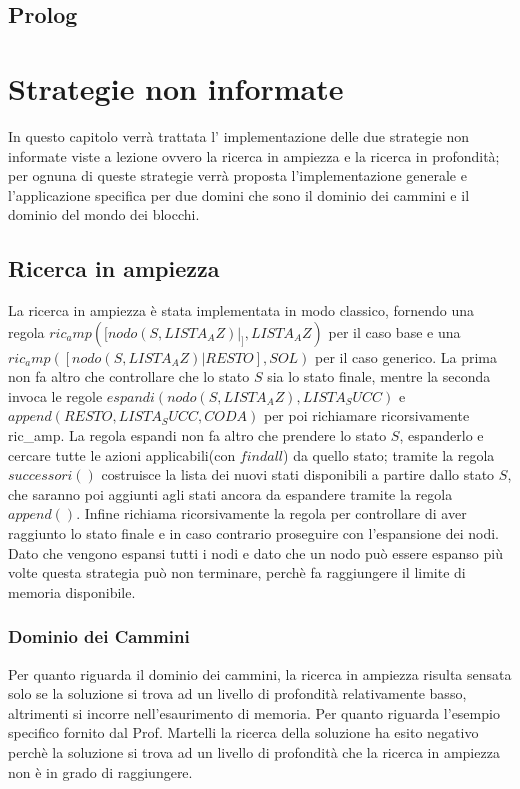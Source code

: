 \section{Prolog}

\chapter{Strategie non informate}
In questo capitolo verrà trattata l' implementazione delle due strategie non informate viste a lezione ovvero la ricerca in ampiezza e la ricerca in profondità; per ognuna di queste strategie verrà proposta l'implementazione generale e l'applicazione specifica per due domini che sono il dominio dei cammini e il dominio del mondo dei blocchi.

\section{Ricerca in ampiezza}
La ricerca in ampiezza è stata implementata in modo classico, fornendo una regola $ric_amp([nodo(S,LISTA_AZ)|_],LISTA_AZ)$ per il caso base e una $ric_amp([nodo(S,LISTA_AZ)|RESTO],SOL)$ per il caso generico. La prima non fa altro che controllare che lo stato $S$ sia lo stato finale, mentre la seconda invoca le regole $espandi(nodo(S,LISTA_AZ),LISTA_SUCC)$ e $append(RESTO,LISTA_SUCC,CODA)$ per poi richiamare ricorsivamente ric_amp. La regola espandi non fa altro che prendere lo stato $S$, espanderlo e cercare tutte le azioni applicabili(con $findall$) da quello stato; tramite la regola $successori()$ costruisce la lista dei nuovi stati disponibili a partire dallo stato $S$, che saranno poi aggiunti agli stati ancora da espandere tramite la regola $append()$. Infine richiama ricorsivamente la regola per controllare di aver raggiunto lo stato finale e in caso contrario proseguire con l'espansione dei nodi.
Dato che vengono espansi tutti i nodi e dato che un nodo può essere espanso più volte questa strategia può non terminare, perchè fa raggiungere il limite di memoria disponibile.

\subsection{Dominio dei Cammini}
Per quanto riguarda il dominio dei cammini, la ricerca in ampiezza risulta sensata solo se la soluzione si trova ad un livello di profondità relativamente basso, altrimenti si incorre nell'esaurimento di memoria. Per quanto riguarda l'esempio specifico fornito dal Prof. Martelli la ricerca della soluzione ha esito negativo perchè la soluzione si trova ad un livello di profondità che la ricerca in ampiezza non è in grado di raggiungere.

